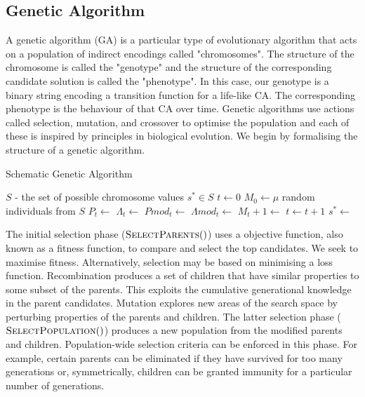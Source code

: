 \subsection{Genetic Algorithm} \label{subsec:life-like-ga}

A genetic algorithm (GA) is a particular type of evolutionary algorithm that acts on a population of indirect encodings called "chromosomes". The structure of the chromosome is called the "genotype" and the structure of the corresponding candidate solution is called the "phenotype". In this case, our genotype is a binary string encoding a transition function for a life-like CA. The corresponding phenotype is the behaviour of that CA over time. Genetic algorithms use actions called selection, mutation, and crossover to optimise the population and each of these is inspired by principles in biological evolution. We begin by formalising the structure of a genetic algorithm.\\

\begin{algorithm}
  \caption{Schematic Genetic Algorithm}\label{alg:ea}
  \begin{algorithmic}
  \Require $S$ - the set of possible chromosome values
  \Ensure $s^* \in S$
  \State $t \gets 0$
  \State $M_0 \gets \mu$ random individuals from $S$
    \State {}
    \State $P_t \gets$     
    \State $\Lambda_t \gets$   
    \State $Pmod_t \gets$ 
    \State $\Lambda mod_t \gets$ 
    \State $M_t+1 \gets$ 
    \State $t \gets t+1$
  \EndWhile
  \State $s^* \gets$ 
  \end{algorithmic}
\end{algorithm}

The initial selection phase ($\Call{SelectParents}$) uses a objective function, also known as a fitness function, to compare and select the top candidates. We seek to maximise fitness. Alternatively, selection may be based on minimising a loss function. Recombination produces a set of children that have similar properties to some subset of the parents. This exploits the cumulative generational knowledge in the parent candidates. Mutation explores new areas of the search space by perturbing properties of the parents and children. The latter selection phase ($\Call{SelectPopulation}$) produces a new population from the modified parents and children. Population-wide selection criteria can be enforced in this phase. For example, certain parents can be eliminated if they have survived for too many generations or, symmetrically, children can be granted immunity for a particular number of generations.\\

